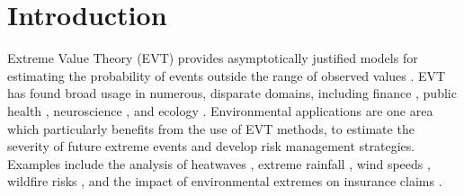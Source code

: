 \documentclass[12pt]{article}
\begin{document}
\section{Introduction}
\label{sec:intro}
Extreme Value Theory (EVT) provides asymptotically justified models for estimating the probability of events outside the range of observed values \citep{Coles2001}.
EVT has found broad usage in numerous, disparate domains, including finance \citep{Poon2004}, public health \citep{Vettori2019}, neuroscience \citep{Talento2025}, and ecology \citep{Koh2025}.
Environmental applications are one area which particularly benefits from the use of EVT methods, to estimate the severity of future extreme events and develop risk management strategies. %
Examples include the analysis of heatwaves \citep{tanarhte2015heat, french2019quantifying}, extreme rainfall \citep{osei2021estimation}, wind speeds \citep{steinkohl2013extreme, soukissian2015effect}, wildfire risks \citep{Koh2024}, and the impact of environmental extremes on insurance claims \citep{Rohrbeck_flooding, Miralles2024}. 
\end{document}
